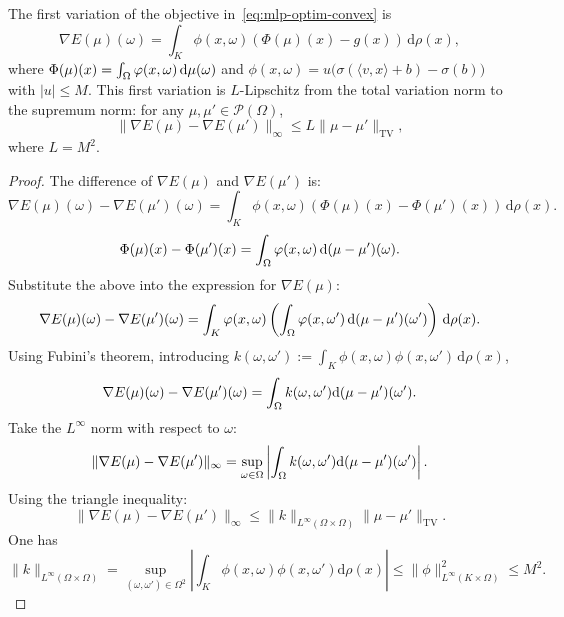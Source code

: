 \begin{prop}
The first variation of the objective in~\eqref{eq:mlp-optim-convex} is
\[
	\nabla E(\mu)(\omega) = \int_K \phi(x, \omega) \left( \Phi(\mu)(x) - g(x) \right) \, \mathrm{d}\rho(x),
\]
where \(\Phi(\mu)(x) = \int_\Omega \varphi(x, \omega) \, \mathrm{d}\mu(\omega)\) and \(\phi(x,\omega)=u\bigl(\sigma(\langle v,x\rangle+b)-\sigma(b)\bigr)\) with $|u|\leq M$. This first variation is $L$-Lipschitz from the total variation norm to the supremum norm: for any \(\mu, \mu' \in \mathcal{P}(\Omega)\),
\[
	\|\nabla E(\mu) - \nabla E(\mu')\|_\infty \leq L \|\mu - \mu'\|_{\text{TV}},
\]
where \(L=M^2\).
\end{prop}

\begin{proof}
The difference of \(\nabla E(\mu)\) and \(\nabla E(\mu')\) is:
\[
\nabla E(\mu)(\omega) - \nabla E(\mu')(\omega) = \int_K \phi(x, \omega) \left( \Phi(\mu)(x) - \Phi(\mu')(x) \right) \, \mathrm{d}\rho(x).
\]
\[
\Phi(\mu)(x) - \Phi(\mu')(x) = \int_\Omega \varphi(x, \omega) \, \mathrm{d}(\mu - \mu')(\omega).
\]
Substitute the above into the expression for \(\nabla E(\mu)\):
\[
\nabla E(\mu)(\omega) - \nabla E(\mu')(\omega) = \int_K \varphi(x, \omega) \left( \int_\Omega \varphi(x, \omega') \, \mathrm{d}(\mu - \mu')(\omega') \right) \, \mathrm{d}\rho(x).
\]
Using Fubini's theorem, introducing $k(\omega,\omega') := \int_K \phi(x, \omega) \phi(x, \omega') \, \mathrm{d}\rho(x)$,
\[
\nabla E(\mu)(\omega) - \nabla E(\mu')(\omega) = \int_\Omega k(\omega,\omega') \mathrm{d}(\mu - \mu')(\omega').
\]
Take the \(L^\infty\) norm with respect to \(\omega\):
\[
\|\nabla E(\mu) - \nabla E(\mu')\|_\infty = \sup_{\omega \in \Omega} \left| \int_\Omega k(\omega,\omega') \mathrm{d}(\mu - \mu')(\omega') \right|.
\]
Using the triangle inequality:
\[
\|\nabla E(\mu) - \nabla E(\mu')\|_\infty \leq \|k\|_{L^\infty(\Omega\times\Omega)} \|\mu - \mu'\|_{\mathrm{TV}}.
\]
One has 
$$
	\|k\|_{L^\infty(\Omega\times\Omega)} = \sup_{(\omega,\omega') \in \Omega^2} |\int_K \phi(x, \omega) \phi(x, \omega')  \mathrm{d}\rho(x)|
	\leq \|\phi\|^2_{L^\infty(K \times \Omega)} \leq M^2.
$$
\end{proof}
